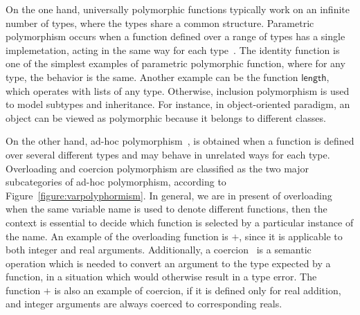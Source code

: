 \documentclass[hidelinks, twocolumn]{article}
\begin{document}
On the one hand, universally polymorphic functions typically work on an infinite number of types, where the types share a common structure. Parametric polymorphism occurs when a function defined over a range of types has a single implemetation, acting in the same way for each type~\cite{CardelliWegner, scott, wadlerBlott:popl89}. The identity function is one of the simplest examples of parametric polymorphic function, where for any type, the behavior is the same. Another example can be the function $\mathsf{length}$, which operates with lists of any type. Otherwise, inclusion polymorphism is used to model subtypes and inheritance. For instance, in object-oriented paradigm, an object can be viewed as polymorphic because it belongs to different classes.

On the other hand, ad-hoc polymorphism~\cite{CardelliWegner, wadlerBlott:popl89}, is obtained when a function is defined over several different types and may behave in unrelated ways for each type.  Overloading and coercion polymorphism are classified as the two major subcategories of ad-hoc polymorphism, according to Figure~\ref{figure:varpolyphormism}. In general, we are in present of overloading when the same variable name is used to denote different functions, then the context is essential to decide which function is selected by a particular instance of the name. An example of the overloading function is $+$, since it is applicable to both integer and real arguments. Additionally, a coercion~\cite{CardelliWegner} is a semantic operation which is needed to convert an argument to the type expected by a function, in a situation which would otherwise result in a type error. The function $+$ is also an example of coercion, if it is defined only for real addition, and integer arguments are always coerced to corresponding reals.
\end{document}
